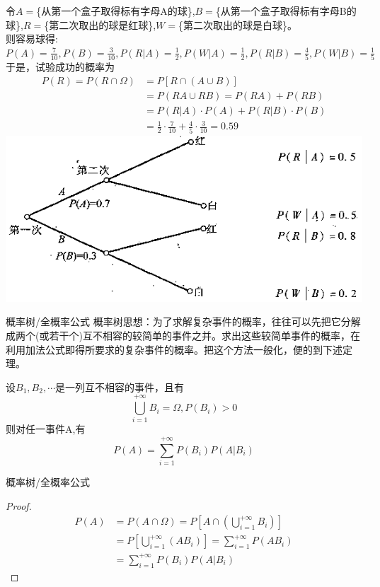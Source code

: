 \begin{frame}
\begin{solution}
	令$A=$\{从第一个盒子取得标有字母A的球\},$B=$\{从第一个盒子取得标有字母B的球\},$R=$\{第二次取出的球是红球\},$W=$\{第二次取出的球是白球\}。\\
	则容易球得: $P(A)=\frac{7}{10}, P(B)=\frac{3}{10}, P(R|A)=\frac{1}{2},P(W|A)=\frac{1}{2},P(R|B)=\frac{4}{5},P(W|B)=\frac{1}{5}$\\
	于是，试验成功的概率为
	\begin{align*}
	P(R)=P(R\cap\Omega)&=P[R\cap(A\cup B)]\\
	&=P(RA\cup RB)=P(RA)+P(RB)\\
	&=P(R|A)\cdot P(A)+P(R|B)\cdot P(B)\\
	&=\frac{1}{2}\cdot\frac{7}{10}+\frac{4}{5}\cdot\frac{3}{10}=0.59
	\end{align*}
	\includegraphics[scale=0.18]{tree}
\end{solution}
\end{frame}

\begin{frame}{概率树/全概率公式}
概率树思想：为了求解复杂事件的概率，往往可以先把它分解成两个(或若干个)互不相容的较简单的事件之并。求出这些较简单事件的概率，在利用加法公式即得所要求的复杂事件的概率。把这个方法一般化，便的到下述定理。
\begin{theorem}
	设$B_1,B_2,\cdots$是一列互不相容的事件，且有
	\[\bigcup_{i=1}^{+\infty}B_i=\Omega,P(B_i)>0 \]
	则对任一事件A,有
	\[P(A)=\sum_{i=1}^{+\infty}P(B_i)P(A|B_i) \]	
\end{theorem}
\end{frame}

\begin{frame}{概率树/全概率公式}
\begin{proof}
	\begin{align*}
	P(A)&=P(A\cap\Omega)=P[A\cap(\bigcup_{i=1}^{+\infty}B_i)]\\
	&=P[\bigcup_{i=1}^{+\infty}(AB_i)]=\sum_{i=1}^{+\infty}P(AB_i)\\
	&=\sum_{i=1}^{+\infty}P(B_i)P(A|B_i)
	\end{align*}
\end{proof}
\end{frame}

